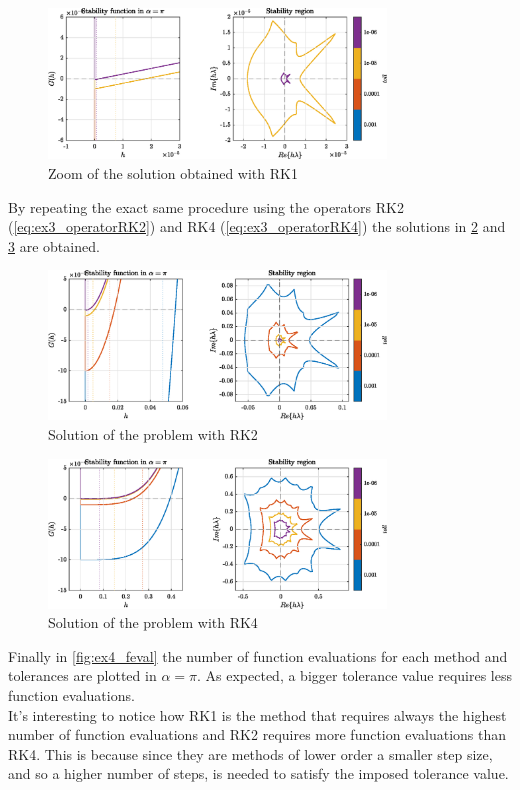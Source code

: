 \documentclass[11pt,a4paper,oneside]{article}
\begin{document}
\begin{figure}[htb]
    \centering
    \includegraphics*[width=0.8\textwidth, keepaspectratio]{ex4_RK1zoom.eps}
    \caption[]{\label{fig:ex4_RK1zoom} Zoom of the solution obtained with RK1}
\end{figure}

By repeating the exact same procedure using the operators RK2 (\cref{eq:ex3_operatorRK2}) and RK4 (\cref{eq:ex3_operatorRK4}) the solutions in \cref{fig:ex4_RK2} and \cref{fig:ex4_RK4} are obtained.
\begin{figure}[htb]
    \centering
    \includegraphics*[width=0.8\textwidth, keepaspectratio]{ex4_RK2.eps}
    \caption[]{\label{fig:ex4_RK2} Solution of the problem with RK2}
\end{figure}
\begin{figure}[htb]
    \centering
    \includegraphics*[width=0.8\textwidth, keepaspectratio]{ex4_RK4.eps}
    \caption[]{\label{fig:ex4_RK4} Solution of the problem with RK4}
\end{figure}

Finally in \cref{fig:ex4_feval} the number of function evaluations for each method and tolerances are plotted in $\alpha = \pi$.
As expected, a bigger tolerance value requires less function evaluations.\\
It's interesting to notice how RK1 is the method that requires always the highest number of function evaluations and RK2 requires more function evaluations than RK4.
This is because since they are methods of lower order a smaller step size, and so a higher number of steps, is needed to satisfy the imposed tolerance value.
\end{document}
